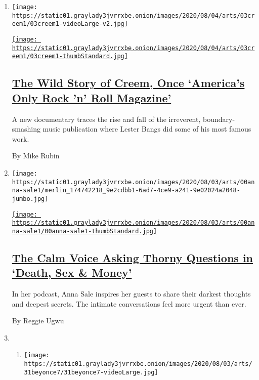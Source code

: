 \begin{enumerate}
\def\labelenumi{\arabic{enumi}.}
\item
  \texttt{[image: https://static01.graylady3jvrrxbe.onion/images/2020/08/04/arts/03creem1/03creem1-videoLarge-v2.jpg]}

  \href{/2020/08/03/arts/music/creem-magazine-documentary.html}{\texttt{[image: https://static01.graylady3jvrrxbe.onion/images/2020/08/04/arts/03creem1/03creem1-thumbStandard.jpg]}}

  \hypertarget{the-wild-story-of-creem-once-americas-only-rock-n-roll-magazine}{%
  \subsection{\texorpdfstring{\href{/2020/08/03/arts/music/creem-magazine-documentary.html}{The
  Wild Story of Creem, Once `America's Only Rock 'n' Roll
  Magazine'}}{The Wild Story of Creem, Once `America's Only Rock 'n' Roll Magazine'}}\label{the-wild-story-of-creem-once-americas-only-rock-n-roll-magazine}}

  A new documentary traces the rise and fall of the irreverent,
  boundary-smashing music publication where Lester Bangs did some of his
  most famous work.

  By Mike Rubin
\item
  \texttt{[image: https://static01.graylady3jvrrxbe.onion/images/2020/08/03/arts/00anna-sale1/merlin\_174742218\_9e2cdbb1-6ad7-4ce9-a241-9e02024a2048-jumbo.jpg]}

  \href{/2020/08/02/arts/anna-sale-death-sex-money-podcast.html}{\texttt{[image: https://static01.graylady3jvrrxbe.onion/images/2020/08/03/arts/00anna-sale1/00anna-sale1-thumbStandard.jpg]}}

  \hypertarget{the-calm-voice-asking-thorny-questions-in-death-sex--money}{%
  \subsection{\texorpdfstring{\href{/2020/08/02/arts/anna-sale-death-sex-money-podcast.html}{The
  Calm Voice Asking Thorny Questions in `Death, Sex \&
  Money'}}{The Calm Voice Asking Thorny Questions in `Death, Sex \& Money'}}\label{the-calm-voice-asking-thorny-questions-in-death-sex--money}}

  In her podcast, Anna Sale inspires her guests to share their darkest
  thoughts and deepest secrets. The intimate conversations feel more
  urgent than ever.

  By Reggie Ugwu
\item
  \begin{enumerate}
  \def\labelenumii{\arabic{enumii}.}
  \item
    \texttt{[image: https://static01.graylady3jvrrxbe.onion/images/2020/08/03/arts/31beyonce7/31beyonce7-videoLarge.jpg]}


\end{enumerate}
\end{enumerate}
